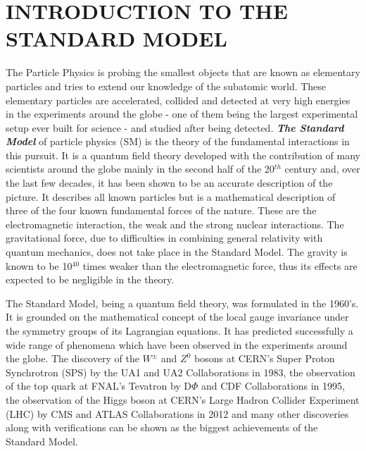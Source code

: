 \chapter{INTRODUCTION TO THE STANDARD MODEL}\label{Ch1}

The Particle Physics is probing the smallest objects that are known as elementary particles and tries to extend our knowledge of the subatomic world. These elementary particles are accelerated, collided and detected at very high energies in the experiments around the globe - one of them being the largest experimental setup ever built for science - and studied after being detected. \textbf{\textit{The Standard Model}} of particle physics (SM) is the theory of the fundamental interactions in this pursuit. It is a quantum field theory developed with the contribution of many scientists around the globe mainly in the second half of the 20$^{th}$ century and, over the last few decades, it has been shown to be an accurate description of the picture. It describes all known particles but is a mathematical description of three of the four known fundamental forces of the nature. These are the electromagnetic interaction, the weak and the strong nuclear interactions. The gravitational force, due to difficulties in combining general relativity with quantum mechanics, does not take place in the Standard Model. The gravity is known to be 10$^{40}$ times weaker than the electromagnetic force, thus its effects are expected to be negligible in the theory.

The Standard Model, being a quantum field theory, was formulated in the 1960's. It is grounded on the mathematical concept of the local gauge invariance under the symmetry groups of its Lagrangian equations. It has predicted successfully a wide range of phenomena which have been observed in the experiments around the globe. The discovery of the $W^\pm$ and $Z^0$ bosons at CERN's Super Proton Synchrotron (SPS) by the UA1 and UA2 Collaborations in 1983\cite{SPS-1, SPS-2, SPS-3, SPS-4, SPS-5}, the observation of the top quark at FNAL's Tevatron by D$\Phi$ and CDF Collaborations in 1995\cite{fnal-1, fnal-2}, the observation of the Higgs boson at CERN's Large Hadron Collider Experiment (LHC) by CMS and ATLAS Collaborations in 2012\cite{HiggsCMS,HiggsATLAS} and many other discoveries along with verifications can be shown as the biggest achievements of the Standard Model.

